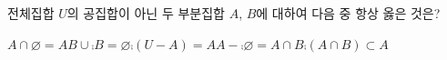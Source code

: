 전체집합 $U$의 공집합이 아닌 두 부분집합 $A$, $B$에 대하여 다음 중 항상 옳은 것은?
\begin{choicesii}{$A\cap\varnothing=A$}{$B\cup\comp{B}=\varnothing$}{$\comp{(U-A)}=A$}{$A-\comp{\varnothing}=A\cap B$}{$\comp{(A\cap B)}\subset A$}\end{choicesii}
